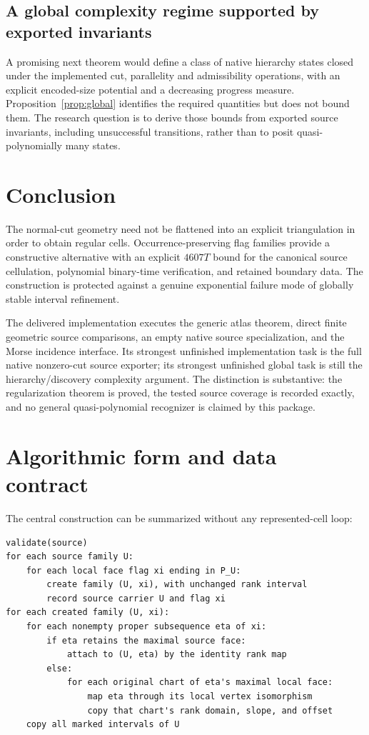 \documentclass[11pt]{article}
\theoremstyle{definition}\newtheorem{definition}[theorem]{Definition}
\theoremstyle{remark}\newtheorem{remark}[theorem]{Remark}
\begin{document}
\subsection{A global complexity regime supported by exported invariants}
A promising next theorem would define a class of native hierarchy states closed under the implemented cut, parallelity and admissibility operations, with an explicit encoded-size potential and a decreasing progress measure. Proposition~\ref{prop:global} identifies the required quantities but does not bound them. The research question is to derive those bounds from exported source invariants, including unsuccessful transitions, rather than to posit quasi-polynomially many states.

\section{Conclusion}
The normal-cut geometry need not be flattened into an explicit triangulation in order to obtain regular cells. Occurrence-preserving flag families provide a constructive alternative with an explicit \(4607T\) bound for the canonical source cellulation, polynomial binary-time verification, and retained boundary data. The construction is protected against a genuine exponential failure mode of globally stable interval refinement.

The delivered implementation executes the generic atlas theorem, direct finite geometric source comparisons, an empty native source specialization, and the Morse incidence interface. Its strongest unfinished implementation task is the full native nonzero-cut source exporter; its strongest unfinished global task is still the hierarchy/discovery complexity argument. The distinction is substantive: the regularization theorem is proved, the tested source coverage is recorded exactly, and no general quasi-polynomial recognizer is claimed by this package.

\appendix
\section{Algorithmic form and data contract}
\label{app:algorithm}
The central construction can be summarized without any represented-cell loop:
\begin{verbatim}
validate(source)
for each source family U:
    for each local face flag xi ending in P_U:
        create family (U, xi), with unchanged rank interval
        record source carrier U and flag xi
for each created family (U, xi):
    for each nonempty proper subsequence eta of xi:
        if eta retains the maximal source face:
            attach to (U, eta) by the identity rank map
        else:
            for each original chart of eta's maximal local face:
                map eta through its local vertex isomorphism
                copy that chart's rank domain, slope, and offset
    copy all marked intervals of U
\end{verbatim}
\end{document}
